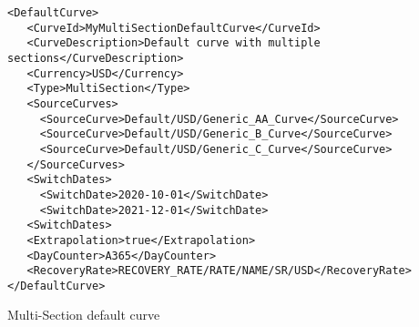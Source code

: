 \begin{longlisting}
\begin{verbatim}
<DefaultCurve>
   <CurveId>MyMultiSectionDefaultCurve</CurveId>
   <CurveDescription>Default curve with multiple sections</CurveDescription>
   <Currency>USD</Currency>
   <Type>MultiSection</Type>
   <SourceCurves>
     <SourceCurve>Default/USD/Generic_AA_Curve</SourceCurve>
     <SourceCurve>Default/USD/Generic_B_Curve</SourceCurve>
     <SourceCurve>Default/USD/Generic_C_Curve</SourceCurve>
   </SourceCurves>
   <SwitchDates>
     <SwitchDate>2020-10-01</SwitchDate>
     <SwitchDate>2021-12-01</SwitchDate>
   <SwitchDates>
   <Extrapolation>true</Extrapolation>
   <DayCounter>A365</DayCounter>
   <RecoveryRate>RECOVERY_RATE/RATE/NAME/SR/USD</RecoveryRate>
</DefaultCurve>
\end{verbatim}
\caption{Multi-Section default curve}
\label{lst:defaultcurve_multisection}
\end{longlisting}
